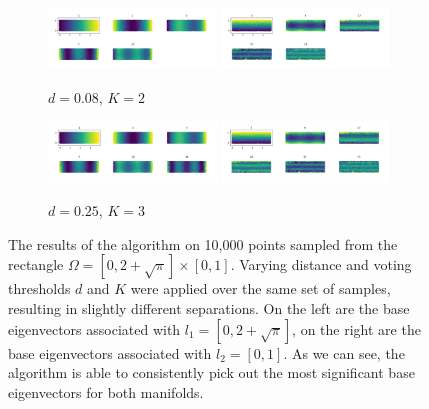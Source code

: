 \documentclass{article}
\numberwithin{equation}{section}
\theoremstyle{definition}
\begin{document}
\begin{figure}
    \centering
    \begin{subfigure}[t]{\textwidth}
        \centering
        \includegraphics[width=0.49\textwidth]{images/manifold1_line_line2.png}
        \includegraphics[width=0.49\textwidth]{images/manifold2_line_line2.png}
        \caption{$d=0.08$, $K=2$}
    \end{subfigure}
    \begin{subfigure}[t]{\textwidth}
        \centering
        \includegraphics[width=0.49\textwidth]{images/manifold1_line_line3.png}
        \includegraphics[width=0.49\textwidth]{images/manifold2_line_line3.png}
        \caption{$d=0.25$, $K=3$}
    \end{subfigure}
    \caption{The results of the algorithm on 10,000 points sampled from the rectangle $\Omega = [0, 2 + \sqrt{\pi}] \times [0,1]$. Varying distance and voting thresholds $d$ and $K$ were applied over the same set of samples, resulting in slightly different separations. On the left are the base eigenvectors associated with $l_1 = [0, 2 + \sqrt{\pi}]$, on the right are the base eigenvectors associated with $l_2 = [0,1]$. As we can see, the algorithm is able to consistently pick out the most significant base eigenvectors for both manifolds.}
    \label{fig:rectangle}
\end{figure}
\end{document}
